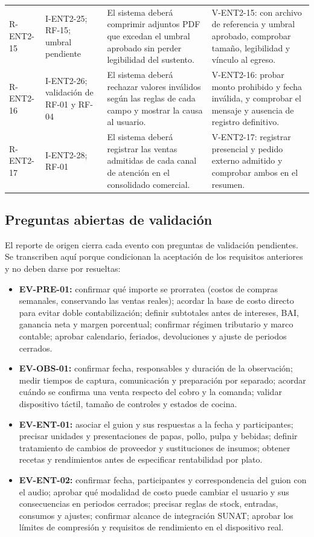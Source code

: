 {\begin{longtable}{L{2.05cm} L{2.75cm} L{6.0cm} L{3.4cm}}
R-ENT2-15 & I-ENT2-25; RF-15; umbral pendiente & El sistema deberá comprimir adjuntos PDF que excedan el umbral aprobado sin perder legibilidad del sustento. & V-ENT2-15: con archivo de referencia y umbral aprobado, comprobar tamaño, legibilidad y vínculo al egreso. \\
R-ENT2-16 & I-ENT2-26; validación de RF-01 y RF-04 & El sistema deberá rechazar valores inválidos según las reglas de cada campo y mostrar la causa al usuario. & V-ENT2-16: probar monto prohibido y fecha inválida, y comprobar el mensaje y ausencia de registro definitivo. \\
R-ENT2-17 & I-ENT2-28; RF-01 & El sistema deberá registrar las ventas admitidas de cada canal de atención en el consolidado comercial. & V-ENT2-17: registrar presencial y pedido externo admitido y comprobar ambos en el resumen. \\
\end{longtable}
}

\subsection{Preguntas abiertas de validación}
\label{subsec:preguntas}

El reporte de origen cierra cada evento con preguntas de validación
pendientes. Se transcriben aquí porque condicionan la aceptación de los
requisitos anteriores y no deben darse por resueltas:

\begin{itemize}
  \item \textbf{EV-PRE-01:} confirmar qué importe se prorratea (costos de
  compras semanales, conservando las ventas reales); acordar la base de
  costo directo para evitar doble contabilización; definir subtotales antes
  de intereses, BAI, ganancia neta y margen porcentual; confirmar régimen
  tributario y marco contable; aprobar calendario, feriados, devoluciones y
  ajuste de periodos cerrados.
  \item \textbf{EV-OBS-01:} confirmar fecha, responsables y duración de la
  observación; medir tiempos de captura, comunicación y preparación por
  separado; acordar cuándo se confirma una venta respecto del cobro y la
  comanda; validar dispositivo táctil, tamaño de controles y estados de
  cocina.
  \item \textbf{EV-ENT-01:} asociar el guion y sus respuestas a la fecha y
  participantes; precisar unidades y presentaciones de papas, pollo, pulpa
  y bebidas; definir tratamiento de cambios de proveedor y sustituciones de
  insumos; obtener recetas y rendimientos antes de especificar
  rentabilidad por plato.
  \item \textbf{EV-ENT-02:} confirmar fecha, participantes y
  correspondencia del guion con el audio; aprobar qué modalidad de costo
  puede cambiar el usuario y sus consecuencias en periodos cerrados;
  precisar reglas de stock, entradas, consumos y ajustes; confirmar alcance
  de integración SUNAT; aprobar los límites de compresión y requisitos de
  rendimiento en el dispositivo real.
\end{itemize}

